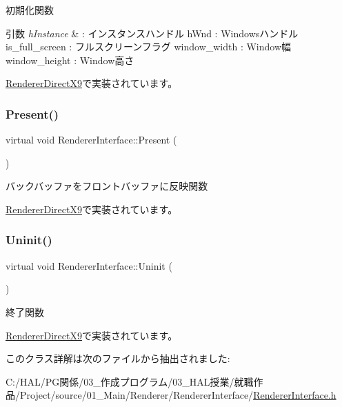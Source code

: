 初期化関数 


\begin{DoxyParams}{引数}
{\em h\+Instance} & \+: インスタンスハンドル h\+Wnd \+: Windowsハンドル is\+\_\+full\+\_\+screen \+: フルスクリーンフラグ window\+\_\+width \+: Window幅 window\+\_\+height \+: Window高さ \\
\hline
\end{DoxyParams}


\mbox{\hyperlink{class_renderer_direct_x9_af015676b50f3ce1ba7cf20abf6074e3b}{Renderer\+Direct\+X9}}で実装されています。

\mbox{\label{class_renderer_interface_aa9e12d2a2f5ffa351c457cfc7806b6f1}} 
\subsubsection{\texorpdfstring{Present()}{Present()}}
{\footnotesize\ttfamily virtual void Renderer\+Interface\+::\+Present (\begin{DoxyParamCaption}{ }\end{DoxyParamCaption})\hspace{0.3cm}{\ttfamily [pure virtual]}}



バックバッファをフロントバッファに反映関数 



\mbox{\hyperlink{class_renderer_direct_x9_a77dbc76e8adbe4f9ee41c5f09e5ebe81}{Renderer\+Direct\+X9}}で実装されています。

\mbox{\label{class_renderer_interface_ada105489f9db98e7e9542b278699d558}} 
\subsubsection{\texorpdfstring{Uninit()}{Uninit()}}
{\footnotesize\ttfamily virtual void Renderer\+Interface\+::\+Uninit (\begin{DoxyParamCaption}{ }\end{DoxyParamCaption})\hspace{0.3cm}{\ttfamily [pure virtual]}}



終了関数 



\mbox{\hyperlink{class_renderer_direct_x9_af7ff314cbaa894d71e37c10565002f8f}{Renderer\+Direct\+X9}}で実装されています。



このクラス詳解は次のファイルから抽出されました\+:\begin{DoxyCompactItemize}
\item 
C\+:/\+H\+A\+L/\+P\+G関係/03\+\_\+作成プログラム/03\+\_\+\+H\+A\+L授業/就職作品/\+Project/source/01\+\_\+\+Main/\+Renderer/\+Renderer\+Interface/\mbox{\hyperlink{_renderer_interface_8h}{Renderer\+Interface.\+h}}\end{DoxyCompactItemize}
